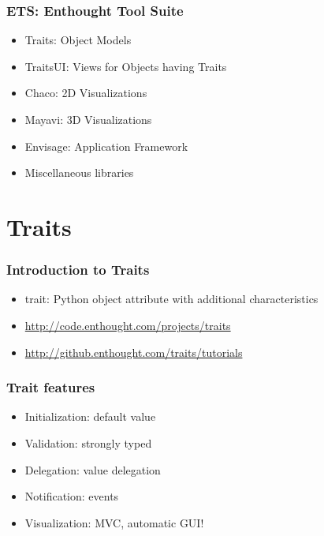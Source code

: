 \documentclass[14pt,compress]{beamer}
\begin{document}
\begin{frame}
  \frametitle{ETS: Enthought Tool Suite}
  \begin{itemize}
    \item Traits: Object Models
    \item TraitsUI: Views for Objects having Traits
    \item Chaco: 2D Visualizations
    \item Mayavi: 3D Visualizations
    \item Envisage: Application Framework
    \vspace*{0.5in}
    \item Miscellaneous libraries
  \end{itemize}
\end{frame}



\section{Traits}

\begin{frame}
  \frametitle{Introduction to Traits}
  \begin{itemize}
    \item  \alert{trait}: Python object attribute with additional characteristics
    \vspace*{2em}

    \item \url{http://code.enthought.com/projects/traits}
    \item \url{http://github.enthought.com/traits/tutorials}

  \end{itemize}
\end{frame}

\begin{frame}
  \frametitle{Trait features}
  \begin{itemize}
    \item Initialization: default value
    \item Validation: strongly typed
    \item Delegation: value delegation
    \item Notification: events
    \item Visualization: MVC, automatic GUI!
  \end{itemize}
\end{frame}
\end{document}
